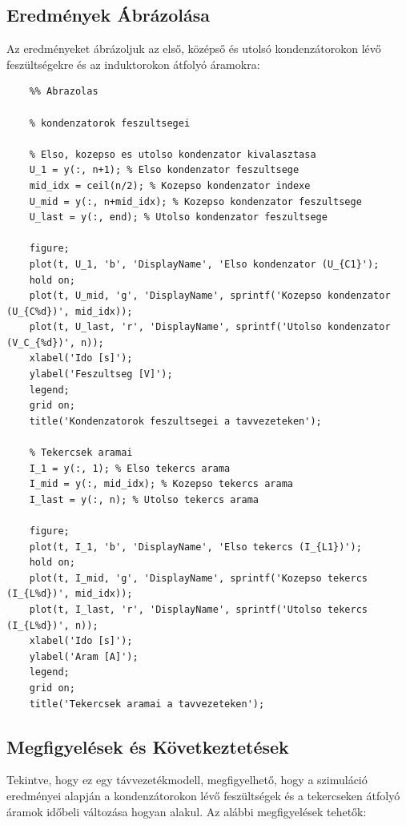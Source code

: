\documentclass[12pt,a4paper]{article}
\begin{document}
\pagebreak

\subsection*{Eredmények Ábrázolása}

Az eredményeket ábrázoljuk az első, középső és utolsó kondenzátorokon lévő feszültségekre és az induktorokon átfolyó áramokra:

\begin{lstlisting}
    %% Abrazolas

    % kondenzatorok feszultsegei
    
    % Elso, kozepso es utolso kondenzator kivalasztasa
    U_1 = y(:, n+1); % Elso kondenzator feszultsege
    mid_idx = ceil(n/2); % Kozepso kondenzator indexe
    U_mid = y(:, n+mid_idx); % Kozepso kondenzator feszultsege
    U_last = y(:, end); % Utolso kondenzator feszultsege
    
    figure;
    plot(t, U_1, 'b', 'DisplayName', 'Elso kondenzator (U_{C1}');
    hold on;
    plot(t, U_mid, 'g', 'DisplayName', sprintf('Kozepso kondenzator (U_{C%d})', mid_idx));
    plot(t, U_last, 'r', 'DisplayName', sprintf('Utolso kondenzator (V_C_{%d})', n));
    xlabel('Ido [s]');
    ylabel('Feszultseg [V]');
    legend;
    grid on;
    title('Kondenzatorok feszultsegei a tavvezeteken');
    
    % Tekercsek aramai
    I_1 = y(:, 1); % Elso tekercs arama
    I_mid = y(:, mid_idx); % Kozepso tekercs arama
    I_last = y(:, n); % Utolso tekercs arama
    
    figure;
    plot(t, I_1, 'b', 'DisplayName', 'Elso tekercs (I_{L1})');
    hold on;
    plot(t, I_mid, 'g', 'DisplayName', sprintf('Kozepso tekercs (I_{L%d})', mid_idx));
    plot(t, I_last, 'r', 'DisplayName', sprintf('Utolso tekercs (I_{L%d})', n));
    xlabel('Ido [s]');
    ylabel('Aram [A]');
    legend;
    grid on;
    title('Tekercsek aramai a tavvezeteken');
\end{lstlisting}

\subsection*{Megfigyelések és Következtetések}

Tekintve, hogy ez egy távvezetékmodell, megfigyelhető, hogy a szimuláció eredményei alapján a kondenzátorokon lévő feszültségek és a tekercseken átfolyó áramok időbeli változása hogyan alakul. Az alábbi megfigyelések tehetők:
\end{document}
